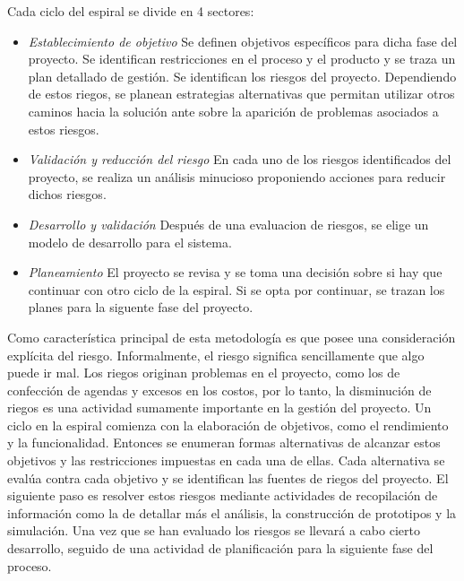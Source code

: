 Cada ciclo del espiral se divide en 4 sectores:
 
\begin {itemize}
\item 
\textit{Establecimiento de objetivo}  Se definen objetivos específicos para dicha fase del proyecto. Se identifican restricciones en el proceso y el
producto y se traza un plan detallado de gestión. Se identifican los riesgos del proyecto. Dependiendo de estos riegos, se planean estrategias
alternativas que permitan utilizar otros caminos hacia la solución ante sobre la aparición de problemas asociados a estos riesgos.
\item 
\textit{Validación y reducción del riesgo}  En cada uno de los riesgos identificados del proyecto, se realiza un análisis minucioso proponiendo
acciones para reducir dichos riesgos.
\item 
\textit{Desarrollo y validación}  Después de una evaluacion de riesgos, se elige un modelo de desarrollo para el sistema.
\item 
\textit{Planeamiento}  El proyecto se revisa y se toma una decisión sobre si hay que continuar con otro ciclo de la espiral. Si se opta por continuar,
se trazan los planes para la siguente fase del proyecto.
\end {itemize}

Como característica principal de esta metodología es que posee una consideración explícita del riesgo. Informalmente, el riesgo significa
sencillamente que algo puede ir mal. Los riegos originan problemas en el proyecto, como los de confección de agendas y excesos en los costos, por lo
tanto, la disminución de riegos es una actividad sumamente importante en la gestión del proyecto. Un ciclo en la espiral comienza con la elaboración
de objetivos, como el rendimiento y la funcionalidad. Entonces se enumeran formas alternativas de alcanzar estos objetivos y las restricciones
impuestas en cada una de ellas. Cada alternativa se evalúa contra cada objetivo y se identifican las fuentes de riegos del proyecto. El siguiente
paso es resolver estos riesgos mediante actividades de recopilación de información como la de detallar más el análisis, la construcción de prototipos
y la simulación. Una vez que se han evaluado los riesgos se llevará a cabo cierto desarrollo, seguido de una actividad de planificación para la
siguiente fase del proceso.


